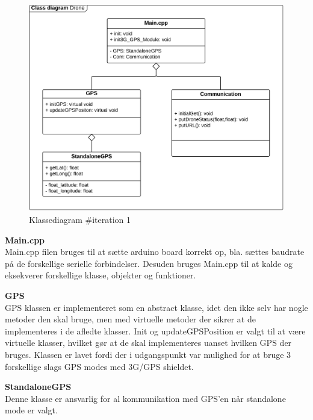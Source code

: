 \vspace{-0.2cm}
\begin{figure}[H]
	\centering
	\includegraphics[width=1\textwidth]{Billeder/klasse_diagrammer/classdiagram_iteration1.png}
	\vspace{-0.5cm}
	\caption{Klassediagram \#iteration 1}
	\label{fig:classDiagram_iteration1}
\end{figure}
\vspace{-0.1cm}

\textbf{Main.cpp} \\
Main.cpp filen bruges til at sætte arduino board korrekt op, bla. sættes baudrate på de forskellige serielle forbindelser. Desuden bruges Main.cpp til at kalde og eksekverer forskellige klasse, objekter og funktioner.

\textbf{GPS} \\
GPS klassen er implementeret som en abstract klasse, idet den ikke selv har nogle metoder den skal bruge, men med virtuelle metoder der sikrer at de implementeres i de afledte klasser. 
Init og updateGPSPosition er valgt til at være virtuelle klasser, hvilket gør at de skal implementeres uanset hvilken GPS der bruges. Klassen er lavet fordi der i udgangspunkt var mulighed for at bruge 3 forskellige slags GPS modes med 3G/GPS shieldet. 

\textbf{StandaloneGPS}\\
Denne klasse er ansvarlig for al kommunikation med GPS'en når standalone mode er valgt. 

\newpage

